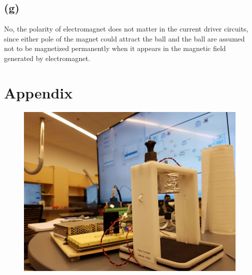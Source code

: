 \documentclass[letterpaper]{article}
\begin{document}
\subsection*{(g)}
No, the polarity of electromagnet does not matter in the current driver circuits, since either pole of the magnet could attract the ball and the ball are assumed not to be magnetized permanently when it appears in the magnetic field generated by electromagnet.

\hspace*{2em}
\section*{Appendix}
\begin{figure}[H]
	\centering
	\includegraphics[scale=0.4]{physnapshot.jpeg}
\end{figure}
\end{document}
